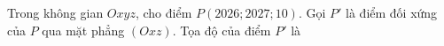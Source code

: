 \begin{ex}
Trong không gian $Oxyz$, cho điểm $P(2026;2027;10)$. Gọi $P'$ là điểm đối xứng của $P$ qua mặt phẳng $(Oxz)$. Tọa độ của điểm $P'$ là
\end{ex}
